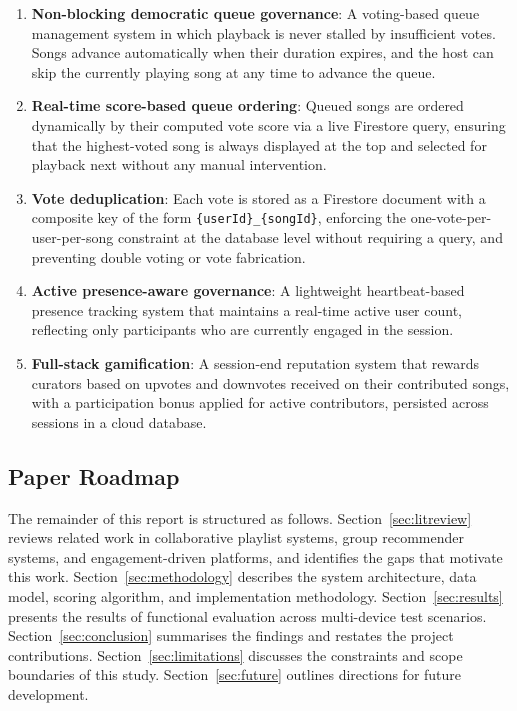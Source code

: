 \documentclass[pdflatex,sn-mathphys-num,iicol]{sn-jnl}
\theoremstyle{thmstyleone}%
\theoremstyle{thmstyletwo}%
\theoremstyle{thmstylethree}%
\begin{document}
\begin{enumerate}
    \item \textbf{Non-blocking democratic queue governance}: A voting-based queue
    management system in which playback is never stalled by insufficient votes. Songs
    advance automatically when their duration expires, and the host can skip the
    currently playing song at any time to advance the queue.

    \item \textbf{Real-time score-based queue ordering}: Queued songs are ordered
    dynamically by their computed vote score via a live Firestore query, ensuring that
    the highest-voted song is always displayed at the top and selected for playback
    next without any manual intervention.

    \item \textbf{Vote deduplication}: Each vote is stored as a Firestore document with
    a composite key of the form \texttt{\{userId\}\_\{songId\}}, enforcing the
    one-vote-per-user-per-song constraint at the database level without requiring a
    query, and preventing double voting or vote fabrication.

    \item \textbf{Active presence-aware governance}: A lightweight heartbeat-based
    presence tracking system that maintains a real-time active user count, reflecting
    only participants who are currently engaged in the session.

    \item \textbf{Full-stack gamification}: A session-end reputation system that
    rewards curators based on upvotes and downvotes received on their contributed
    songs, with a participation bonus applied for active contributors, persisted
    across sessions in a cloud database.
\end{enumerate}

\subsection{Paper Roadmap}

The remainder of this report is structured as follows.
Section~\ref{sec:litreview} reviews related work in collaborative playlist systems,
group recommender systems, and engagement-driven platforms, and identifies the gaps that
motivate this work. Section~\ref{sec:methodology} describes the system architecture,
data model, scoring algorithm, and implementation methodology.
Section~\ref{sec:results} presents the results of functional evaluation across
multi-device test scenarios. Section~\ref{sec:conclusion} summarises the findings and
restates the project contributions. Section~\ref{sec:limitations} discusses the
constraints and scope boundaries of this study. Section~\ref{sec:future} outlines
directions for future development.
\end{document}
